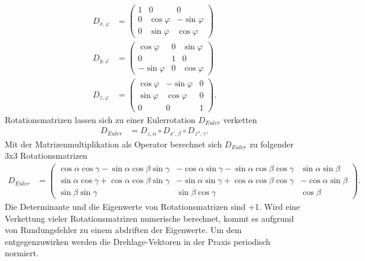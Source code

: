 \begin{align}
	D_{x,\varphi} &= \begin{pmatrix}
		1 & 0 & 0\\
		0 & \cos{\varphi} & -\sin{\varphi}\\
		0 & \sin{\varphi} & \cos{\varphi}
	\end{pmatrix}\\
	D_{y,\varphi} &= \begin{pmatrix}
		\cos{\varphi} & 0 & \sin{\varphi}\\
		0 & 1 & 0\\
		-\sin{\varphi} & 0 & \cos{\varphi} 
	\end{pmatrix}\\
	D_{z,\varphi} &= \begin{pmatrix}
		\cos{\varphi} & -\sin{\varphi} & 0\\
		\sin{\varphi} & \cos{\varphi} & 0\\
		0 & 0 & 1
	\end{pmatrix}.
\end{align}
Rotationsmatrizen lassen sich zu einer Eulerrotation $D_{Euler}$ verketten
\begin{align}
	D_{Euler} &= D_{z, \alpha}\circ D_{x', \beta}\circ D_{z'', \gamma}. 
\end{align}
Mit der Matrizenmultiplikation als Operator berechnet sich $D_{Euler}$ zu folgender 3x3 Rotationsmatrizen
\begin{align}
	D_{Euler} &= \begin{pmatrix}
		\cos{\alpha}\cos{\gamma} - \sin{\alpha}\cos{\beta}\sin{\gamma} & -\cos{\alpha}\sin{\gamma} - \sin{\alpha}\cos{\beta}\cos{\gamma} & \sin{\alpha}\sin{\beta}\\
		\sin{\alpha}\cos{\gamma} + \cos{\alpha}\cos{\beta}\sin{\gamma} & -\sin{\alpha}\sin{\gamma} + \cos{\alpha}\cos{\beta}\cos{\gamma} & -\cos{\alpha}\sin{\beta}\\
		\sin{\beta}\sin{\gamma} & \sin{\beta}\cos{\gamma} & \cos{\beta}
	\end{pmatrix}.
\end{align}
Die Determinante und die Eigenwerte von Rotationsmatrizen sind +1. Wird eine Verkettung vieler Rotationsmatrizen numerische berechnet, kommt es aufgrund von Rundungsfehler zu einem abdriften der Eigenwerte. Um dem entgegenzuwirken werden die Drehlage-Vektoren in der Praxis periodisch normiert.

